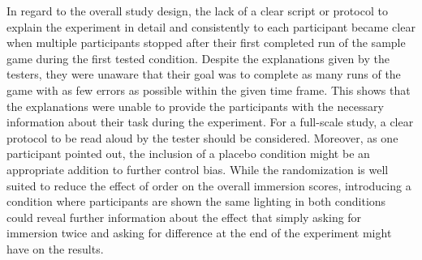 \documentclass[12pt,twoside,english]{article}
\begin{document}
In regard to the overall study design, the lack of a clear script or protocol to explain the experiment in detail and consistently to each participant became clear when multiple participants stopped after their first completed run of the sample game during the first tested condition.
Despite the explanations given by the testers, they were unaware that their goal was to complete as many runs of the game with as few errors as possible within the given time frame.
This shows that the explanations were unable to provide the participants with the necessary information about their task during the experiment.
For a full-scale study, a clear protocol to be read aloud by the tester should be considered.
Moreover, as one participant pointed out, the inclusion of a placebo condition might be an appropriate addition to further control bias.
While the randomization is well suited to reduce the effect of order on the overall immersion scores, introducing a condition where participants are shown the same lighting in both conditions could reveal further information about the effect that simply asking for immersion twice and asking for difference at the end of the experiment might have on the results.
\end{document}
